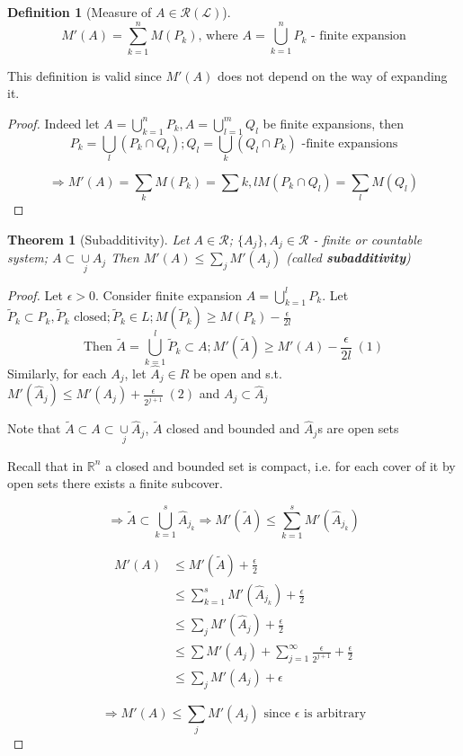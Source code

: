 \documentclass[11pt,a4paper]{report}
\theoremstyle{plain}
\newtheorem{thm}{Theorem}[section]
\theoremstyle{definition}
\newtheorem*{defn}{Definition}
\theoremstyle{remark}
\newcommand{\R}{\mathbb{R}}
\newcommand{\cL}{\mathcal{L}}
\newcommand{\cR}{\mathcal{R}}
\begin{document}
\begin{defn}[Measure of $A\in \cR(\cL)$]
  \[ M'(A) = \sum_{k=1}^n M(P_k) \text{, where } A=\bigcup_{k=1}^n P_k \text{ - finite expansion} \]
\end{defn}

This definition is valid since $M'(A)$ does not depend on the way of expanding it.
\begin{proof}
Indeed let $A = \bigcup_{k=1}^n P_k, A = \bigcup_{l=1}^m Q_l$ be finite expansions, then
\[ P_k = \bigcup_{l} (P_k \cap Q_l); Q_l = \bigcup_k (Q_l \cap P_k) \text{ -finite expansions} \]

\[ \Rightarrow M'(A) = \sum_k M(P_k) = \sum{k,l} M(P_k \cap Q_l) = \sum_l M(Q_l) \]
\end{proof}

\begin{thm}[Subadditivity]
  Let $A \in \cR$; $\{ A_j \}, A_j \in \cR$ - finite or countable system; $A \subset \underset{j}{\cup} A_j$
  Then $M'(A) \leq \sum_j M'(A_j)$ (called \textbf{subadditivity})
\end{thm}

\begin{proof}
  Let $\epsilon > 0$. Consider finite expansion $A = \bigcup_{k=1}^l P_k$.
  Let $\tilde{P}_k \subset P_k, \tilde{P}_k \text{ closed}; \tilde{P}_k \in L; M(\tilde{P}_k) \geq M(P_k) - \frac{\epsilon}{2l}$
  \[ \text{Then } \tilde{A} = \bigcup_{k=1}^l \tilde{P}_k \subset A; M'(\tilde{A}) \geq M'(A) - \frac{\epsilon}{2l} \;(1)\]
  Similarly, for each $A_j$, let $\hat{A}_j \in R$ be open and s.t. $M'(\hat{A}_j) \leq M'(A_j) + \frac{\epsilon}{2^{j+1}} \; (2)$ and $A_j \subset \hat{A}_j$

  Note that $\tilde{A} \subset A \subset \underset{j}{\cup} \hat{A}_j$, $\tilde{A}$ closed and bounded and $\hat{A}_j$s are open sets

  Recall that in $\R^n$ a closed and bounded set is compact, i.e. for each cover of it by open sets there exists a finite subcover.

  \[ \Rightarrow \tilde{A} \subset \bigcup_{k=1}^s \hat{A}_{j_k} \Rightarrow M'(\tilde{A}) \leq \sum_{k=1}^s M'(\hat{A}_{j_k}) \]

  \begin{align*}
      M'(A) &\leq M'(\tilde{A}) + \frac{\epsilon}{2} \\ 
      &\leq \sum_{k=1}^s M'(\hat{A}_{j_k}) + \frac{\epsilon}{2} \\
      &\leq \sum_j M'(\hat{A}_j) + \frac{\epsilon}{2} \\
      &\leq \sum M'(A_j) + \sum_{j=1}^\infty \frac{\epsilon}{2^{j+1}} + \frac{\epsilon}{2} \\
      &\leq \sum_j M'(A_j) + \epsilon 
  \end{align*}
  
  \[ \Rightarrow M'(A) \leq \sum_j M'(A_j) \text{ since } \epsilon \text{ is arbitrary} \]
\end{proof}
\end{document}
